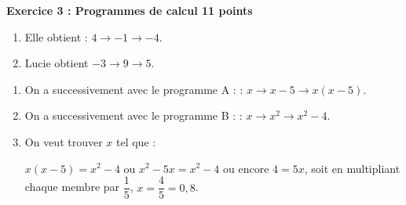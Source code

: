 \documentclass[10pt]{article}
\begin{document}
\vspace{0,5cm}

\textbf{Exercice 3 : Programmes de calcul \hfill 11 points}

\medskip

%
%

\begin{enumerate}
\item %

Elle obtient : $4 \to - 1 \to - 4$. 
\item %

Lucie obtient $- 3 \to 9 \to 5$.
\end{enumerate}

%
\begin{enumerate}[resume]
\item %
On a successivement avec le programme A :  : $x \to x - 5 \to x(x - 5)$.
\item %
On a successivement avec le programme B :  : $x \to x^2 \to x^2 - 4$.
\item %
On veut trouver $x$ tel que :

$x(x - 5) = x^2 - 4$ ou $x^2 - 5x = x^2 - 4$ ou encore $4 = 5x$, soit en multipliant chaque membre par $\dfrac{1}{5}$, \: $x = \dfrac{4}{5} = 0,8$.
\end{enumerate}
\end{document}
